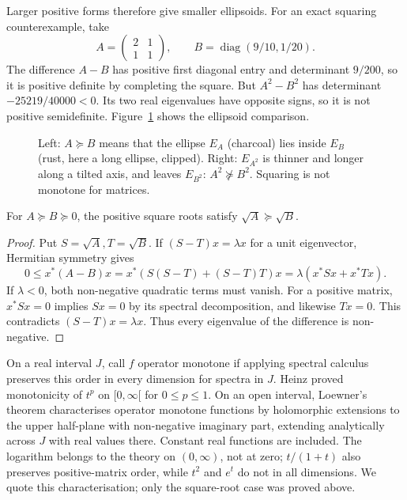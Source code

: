 Larger positive forms therefore give smaller ellipsoids. For an exact squaring counterexample, take
\[A=\begin{pmatrix}2&1\\1&1\end{pmatrix},\qquad B=\operatorname{diag}(9/10,1/20).
\]
The difference $A-B$ has positive first diagonal entry and determinant $9/200$, so it is positive definite by completing the square. But $A^2-B^2$ has determinant $-25219/40000<0$. Its two real eigenvalues have opposite signs, so it is not positive semidefinite. Figure~\ref{linear:fig:loewner} shows the ellipsoid comparison.
\begin{figure}[ht]
\centering
{}
\caption{Left: $A\succeq B$ means that the ellipse $E_A$ (charcoal) lies inside $E_B$ (rust, here a long ellipse, clipped). Right:
$E_{A^2}$ is thinner and longer along a tilted axis, and leaves $E_{B^2}$: $A^2\not\succeq B^2$. Squaring is not monotone for matrices.}
\label{linear:fig:loewner}
\end{figure}

\begin{theorem}\label{linear:thm:sqrtmonotone}
For $A\succeq B\succeq0$, the positive square roots satisfy $\sqrt A\succeq\sqrt B$.
\end{theorem}
\begin{proof}
Put $S=\sqrt A,T=\sqrt B$. If $(S-T)x=\lambda x$ for a unit eigenvector, Hermitian symmetry gives
\[0\le x^*(A-B)x=x^*(S(S-T)+(S-T)T)x
 =\lambda(x^*Sx+x^*Tx).
\]
If $\lambda<0$, both non-negative quadratic terms must vanish. For a positive matrix, $x^*Sx=0$ implies $Sx=0$ by its spectral decomposition, and likewise $Tx=0$. This contradicts $(S-T)x=\lambda x$. Thus every eigenvalue of the difference is non-negative.
\end{proof}

\begin{remark}
On a real interval $J$, call $f$ operator monotone if applying spectral calculus preserves this order in every dimension for spectra in $J$. Heinz proved monotonicity of $t^p$ on $[0,\infty[$ for $0\le p\le1$. On an open interval, Loewner's theorem characterises operator monotone functions by holomorphic extensions to the upper half-plane with non-negative imaginary part, extending analytically across $J$ with real values there. Constant real functions are included. The logarithm belongs to the theory on $(0,\infty)$, not at zero; $t/(1+t)$ also preserves positive-matrix order, while $t^2$ and $e^t$ do not in all dimensions. We quote this characterisation; only the square-root case was proved above.
\end{remark}


